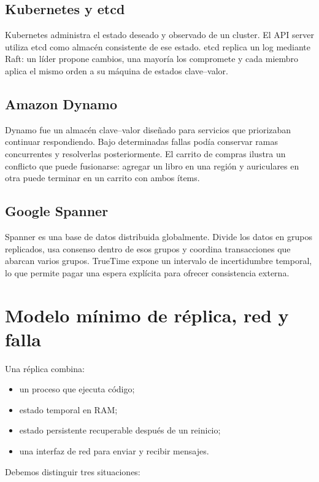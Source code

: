 \documentclass[variant=apuntes,cover=institutional,mode=screen]{ua-engineering-v6-article}
\begin{document}
\subsection{Kubernetes y etcd}

Kubernetes administra el estado deseado y observado de un cluster. El API server utiliza etcd como almacén consistente de ese estado. etcd replica un log mediante Raft: un líder propone cambios, una mayoría los compromete y cada miembro aplica el mismo orden a su máquina de estados clave--valor.

\subsection{Amazon Dynamo}

Dynamo fue un almacén clave--valor diseñado para servicios que priorizaban continuar respondiendo. Bajo determinadas fallas podía conservar ramas concurrentes y resolverlas posteriormente. El carrito de compras ilustra un conflicto que puede fusionarse: agregar un libro en una región y auriculares en otra puede terminar en un carrito con ambos ítems.

\subsection{Google Spanner}

Spanner es una base de datos distribuida globalmente. Divide los datos en grupos replicados, usa consenso dentro de esos grupos y coordina transacciones que abarcan varios grupos. TrueTime expone un intervalo de incertidumbre temporal, lo que permite pagar una espera explícita para ofrecer consistencia externa.

\section{Modelo mínimo de réplica, red y falla}

Una réplica combina:

\begin{itemize}
\item un proceso que ejecuta código;
\item estado temporal en RAM;
\item estado persistente recuperable después de un reinicio;
\item una interfaz de red para enviar y recibir mensajes.
\end{itemize}

Debemos distinguir tres situaciones:
\end{document}
